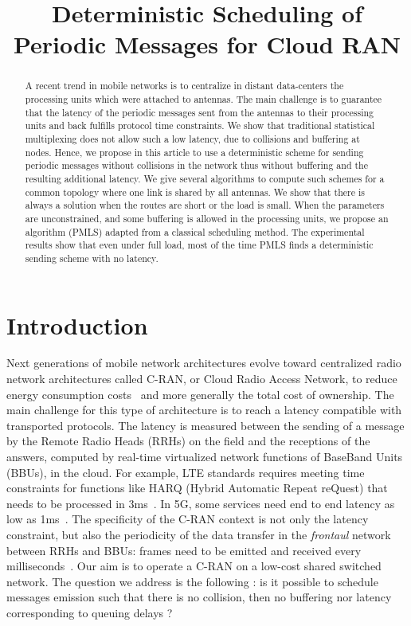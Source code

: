 \documentclass[10pt, conference, letterpaper]{IEEEtran}
\title{Deterministic Scheduling of Periodic Messages for Cloud RAN}
\author{}
\begin{document}
\maketitle

\begin{abstract}
A recent trend in mobile networks is to centralize in distant data-centers the processing units which were attached to 
antennas. The main challenge is to guarantee that the latency of the periodic messages sent from the antennas to their processing
units and back fulfills protocol time constraints. We show that traditional statistical multiplexing does not allow such a low latency, due to collisions and buffering at nodes. Hence, we propose in this article to use a deterministic scheme for sending periodic messages without collisions in the network thus without buffering and the resulting additional latency. 
We give several algorithms to compute such schemes for a common topology where one link is shared by all antennas.
We show that there is always a solution when the routes are short or the load is small. When the parameters are unconstrained,
and some buffering is allowed in the processing units, we propose an algorithm (PMLS) adapted from a classical scheduling method.
The experimental results show that even under full load, most of the time PMLS finds a deterministic sending scheme with no latency.
\end{abstract}


\section{Introduction}

Next generations of mobile network architectures evolve toward centralized radio network architectures called C-RAN, or Cloud Radio Access Network, to reduce energy consumption costs~\cite{mobile2011c} and more generally the total cost of ownership. The main challenge for this type of architecture is to reach a latency compatible with transported protocols. The latency is measured between the sending of a message by the Remote Radio Heads (RRHs) on the field and the receptions of the answers, computed by real-time virtualized network functions of BaseBand Units (BBUs), in the cloud. For example, LTE standards requires meeting time constraints for functions like HARQ (Hybrid Automatic Repeat reQuest) that needs to be processed in $3$ms~\cite{bouguen2012lte}. In 5G, some services need end to end latency as low as 1ms~\cite{3gpp5g}. The specificity of the C-RAN context is not only the latency constraint, but also the periodicity of the data transfer in the \emph{frontaul} network between RRHs and BBUs: frames need to be emitted and received every milliseconds~\cite{bouguen2012lte}.
Our aim is to operate a C-RAN on a low-cost shared switched network.
The question we address is the following : is it possible to schedule messages emission such that there is no collision, then no buffering nor latency corresponding to queuing delays ?
\end{document}

